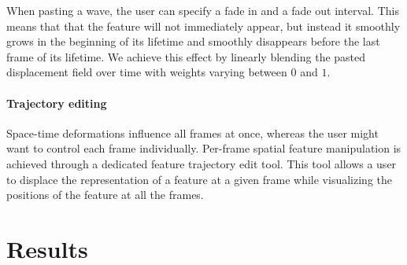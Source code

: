 When pasting a wave, the user can specify a fade in and a fade out interval. 
This means that that the feature will not immediately appear, but instead it smoothly grows in the beginning of its lifetime and smoothly disappears before the last frame of its lifetime. 
We achieve this effect by linearly blending the pasted displacement field over time with weights varying between $0$ and $1$.

\paragraph{Trajectory editing}

Space-time deformations influence all frames at once, whereas the user might want to control each frame individually.
Per-frame spatial feature manipulation is achieved through a dedicated feature trajectory edit tool.
This tool allows a user to displace the representation of a feature at a given frame while visualizing the positions of the feature at all the frames.

\section{Results} \label{sec:results}

